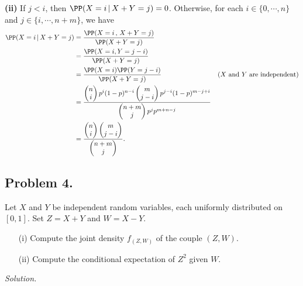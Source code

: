 \textbf{(ii)} If $j< i$, then $\PP(X=i\,|\,X+Y=j) = 0$. Otherwise, for each $i\in\{0,\cdots, n\}$ and $j\in\{i,\cdots,n+m\}$, we have
\begin{align*}
    \PP(X=i\,|\, X+Y=j) 
    &= \dfrac{\PP(X=i\,,\, X+Y=j)}{\PP(X+Y=j)}\\
    &= \dfrac{\PP(X=i, Y=j-i)}{\PP(X+Y=j)}\\
    &=\dfrac{\PP(X=i)\PP(Y=j-i)}{\PP(X+Y=j)} & \text{($X$ and $Y$ are independent)}\\
    &= \dfrac{\begin{pmatrix}
        n\\i
    \end{pmatrix}p^i(1-p)^{n-i}\begin{pmatrix}
        m\\j-i
    \end{pmatrix}p^{j-i}(1-p)^{m-j+i}}{\begin{pmatrix}
        n+m\\j
    \end{pmatrix} p^{j}p^{m+n-j}}\\
    &=\dfrac{\begin{pmatrix}
        n\\i
    \end{pmatrix}\begin{pmatrix}
        m\\j-i
    \end{pmatrix}}{\begin{pmatrix}
        n+m\\j
    \end{pmatrix}}.
\end{align*}

\subsection*{Problem 4.} Let $X$ and $Y$ be independent random variables, each uniformly distributed on $[0, 1]$.
Set $Z = X + Y$ and $W = X - Y$.
\begin{enumerate}
    \item [(i)] Compute the joint density $f_{(Z,W)}$ of the couple $(Z, W)$.
    \item [(ii)] Compute the conditional expectation of $Z^2$ given $W$.
\end{enumerate}

\textit{Solution.}

